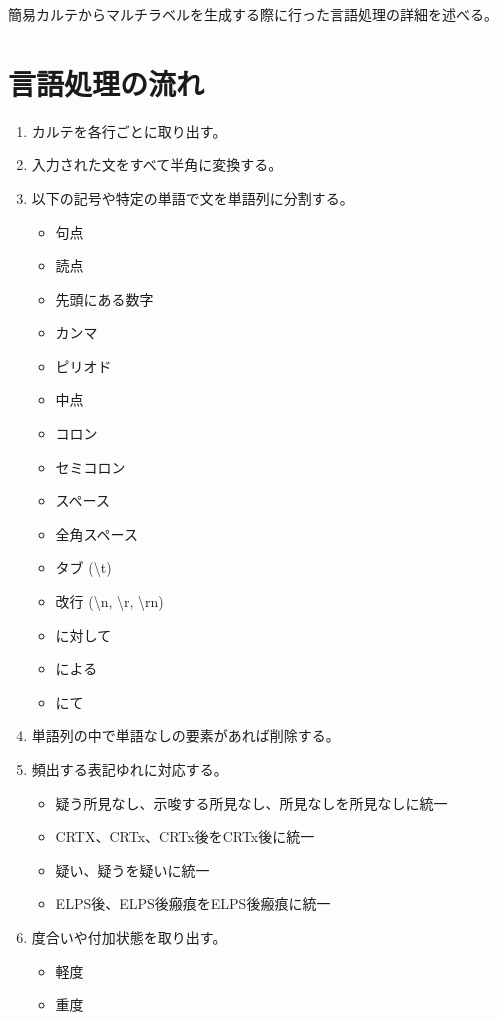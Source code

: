 簡易カルテからマルチラベルを生成する際に行った言語処理の詳細を述べる。
\section{言語処理の流れ}
\begin{enumerate}
    \item カルテを各行ごとに取り出す。
    \item 入力された文をすべて半角に変換する。
    \item 以下の記号や特定の単語で文を単語列に分割する。
    \begin{itemize}
        \item 句点
        \item 読点
        \item 先頭にある数字
        \item カンマ
        \item ピリオド
        \item 中点
        \item コロン
        \item セミコロン
        \item スペース
        \item 全角スペース
        \item タブ (\textbackslash t)
        \item 改行 (\textbackslash n, \textbackslash r, \textbackslash rn)
        \item に対して
        \item による
        \item にて
    \end{itemize}
    \item 単語列の中で単語なしの要素があれば削除する。
    \item 頻出する表記ゆれに対応する。
    \begin{itemize}
        \item 疑う所見なし、示唆する所見なし、所見なしを所見なしに統一
        \item CRTX、CRTx、CRTx後をCRTx後に統一
        \item 疑い、疑うを疑いに統一
        \item ELPS後、ELPS後瘢痕をELPS後瘢痕に統一
    \end{itemize}
    \item 度合いや付加状態を取り出す。
    \begin{itemize}
        \item 軽度
        \item 重度

\end{itemize}
\end{enumerate}
